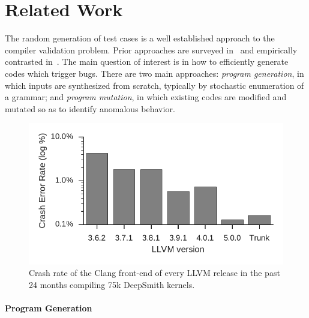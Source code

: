 \section{Related Work}\label{sec:rw}



The random generation of test cases is a well established approach to the compiler validation problem. Prior approaches are surveyed in~\cite{Kossatchev2005,Boujarwah1997} and empirically contrasted in~\cite{Chen2014a}. The main question of interest is in how to efficiently generate codes which trigger bugs. There are two main approaches: \emph{program generation}, in which inputs are synthesized from scratch, typically by stochastic enumeration of a grammar; and \emph{program mutation}, in which existing codes are modified and mutated so as to identify anomalous behavior.

\begin{figure}
	\centering %
	\includegraphics[width=.85\columnwidth]{img/clang-crashes}%
	\caption{%
		Crash rate of the Clang front-end of every LLVM release in the past 24 months compiling 75k DeepSmith kernels.
	}%
  \vspace{-0.8em}
	\label{fig:clangs} %
\end{figure}
\begin{table}
	\footnotesize %
	\centering %
	
	\caption{%
		The number of DeepSmith programs which trigger distinct Clang front-end assertions, and the number of programs which trigger unreachables.%
	}
  \vspace{-3.1em}
	\label{tab:clangs}
\end{table}

\paragraph{Program Generation}

